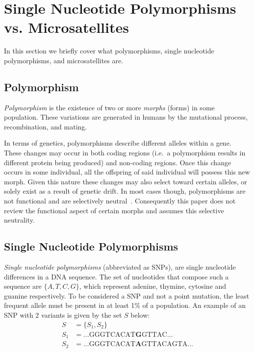 \section{Single Nucleotide Polymorphisms vs. Microsatellites}\label{sec:snpvm}
In this section we briefly cover what polymorphisms, single nucleotide polymorphisms, and microsatellites are.

\subsection{Polymorphism}\label{subsec:p}
\emph{Polymorphism} is the existence of two or more \emph{morphs} (forms) in some population.
These variations are generated in humans by the mutational process, recombination, and mating.

In terms of genetics, polymorphisms describe different alleles within a gene.
These changes may occur in both coding regions (i.e.\ a polymorphism results in different protein being produced) and
non-coding regions.
Once this change occurs in some individual, all the offspring of said individual will possess this new morph.
Given this nature these changes may also select toward certain alleles, or solely exist as a result of genetic drift.
In most cases though, polymorphisms are not functional and are selectively
neutral~\cite{wrightGeneticVariationPolymorphisms2005}.
Consequently this paper does not review the functional aspect of certain morphs and assumes this selective neutrality.

\subsection{Single Nucleotide Polymorphisms}\label{subsec:snp}
\emph{Single nucleotide polymorphisms} (abbreviated as SNPs), are single nucleotide differences in a DNA sequence.
The set of nucleotides that compose such a sequence are $\{ A, T, C, G \}$, which represent adenine, thymine,
cytosine and guanine respectively.
To be considered a SNP and not a point mutation, the least frequent allele must be present in at least 1\% of a
population.
An example of an SNP with 2 variants is given by the set $S$ below:
\begin{align*}
    S &= \{ S_1, S_2 \} \\
    S_1 &= \ldots \text{GGGTCACAT}\textbf{G}\text{GTTAC} \ldots \\
    S_2 &= \ldots \text{GGGTCACAT}\textbf{A}\text{GTTACAGTA} \ldots
\end{align*}

